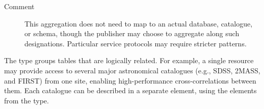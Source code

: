 \documentclass[11pt,a4paper]{ivoa}
\begin{document}
\begin{generated}
\begin{bigdescription}
\begin{description}
\item[Comment] 
                This aggregation does not need to map to an
                actual database, catalogue, or schema, though the
                publisher may choose to aggregate along such
                designations.  Particular service protocols may
                require stricter patterns.
              

\end{description}


\end{bigdescription}\endgroup

\endgroup
\end{generated}



The  type groups
tables that are logically related.
For example, a single
resource may provide access to several major astronomical catalogues
(e.g., SDSS, 2MASS, and FIRST) from one site, enabling high-performance
cross-correlations between them.  Each catalogue can be described in a
separate  element, using the elements from
the  type.
\end{document}
